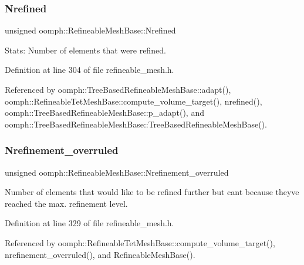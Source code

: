 \subsubsection{\texorpdfstring{Nrefined}{Nrefined}}
{\footnotesize\ttfamily unsigned oomph\+::\+Refineable\+Mesh\+Base\+::\+Nrefined\hspace{0.3cm}{\ttfamily [protected]}}



Stats\+: Number of elements that were refined. 



Definition at line 304 of file refineable\+\_\+mesh.\+h.



Referenced by oomph\+::\+Tree\+Based\+Refineable\+Mesh\+Base\+::adapt(), oomph\+::\+Refineable\+Tet\+Mesh\+Base\+::compute\+\_\+volume\+\_\+target(), nrefined(), oomph\+::\+Tree\+Based\+Refineable\+Mesh\+Base\+::p\+\_\+adapt(), and oomph\+::\+Tree\+Based\+Refineable\+Mesh\+Base\+::\+Tree\+Based\+Refineable\+Mesh\+Base().

\mbox{\label{classoomph_1_1RefineableMeshBase_ad52549170de34203f6b558c50ecf8f8f}} 
\subsubsection{\texorpdfstring{Nrefinement\+\_\+overruled}{Nrefinement\_overruled}}
{\footnotesize\ttfamily unsigned oomph\+::\+Refineable\+Mesh\+Base\+::\+Nrefinement\+\_\+overruled\hspace{0.3cm}{\ttfamily [protected]}}



Number of elements that would like to be refined further but can\textquotesingle{}t because they\textquotesingle{}ve reached the max. refinement level. 



Definition at line 329 of file refineable\+\_\+mesh.\+h.



Referenced by oomph\+::\+Refineable\+Tet\+Mesh\+Base\+::compute\+\_\+volume\+\_\+target(), nrefinement\+\_\+overruled(), and Refineable\+Mesh\+Base().

\mbox{\label{classoomph_1_1RefineableMeshBase_a62c0314a69b2e40355a2aa27ff5ea133}} 
